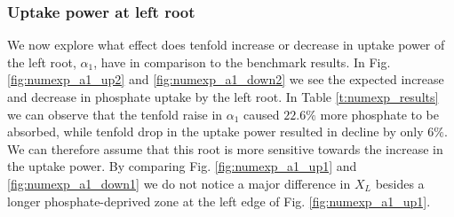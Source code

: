 \documentclass[11pt]{article}
\numberwithin{equation}{section}
\begin{document}
\subsubsection{Uptake power at left root}
\label{sec:numexp_a1}
We now explore what effect does tenfold increase or decrease in uptake power of the left root, $\alpha_1$, have in comparison to the benchmark results. In Fig. \ref{fig:numexp_a1_up2} and \ref{fig:numexp_a1_down2} we see the expected increase and decrease in phosphate uptake by the left root. In Table \ref{t:numexp_results} we can observe that the tenfold raise in $\alpha_1$ caused $22.6 \%$ more phosphate to be absorbed, while tenfold drop in the uptake power resulted in decline by only $6 \%$. We can therefore assume that this root is more sensitive towards the increase in the uptake power. By comparing Fig. \ref{fig:numexp_a1_up1} and \ref{fig:numexp_a1_down1} we do not notice a major difference in $X_L$ besides a longer phosphate-deprived zone at the left edge of Fig. \ref{fig:numexp_a1_up1}.
\end{document}
